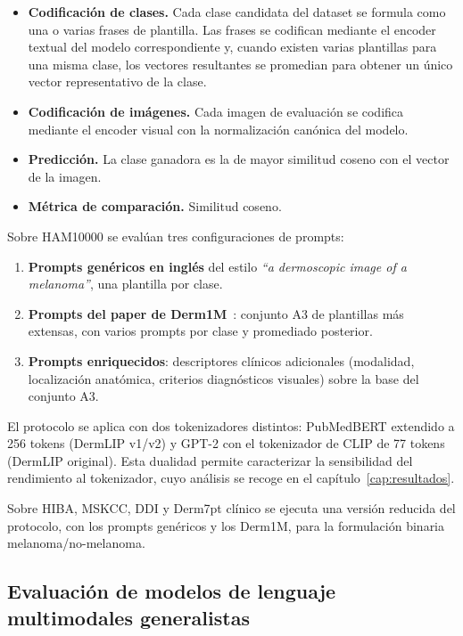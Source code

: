 \begin{itemize}
\item \textbf{Codificación de clases.} Cada clase candidata del
dataset se formula como una o varias frases de plantilla. Las
frases se codifican mediante el encoder textual del modelo
correspondiente y, cuando existen varias plantillas para una
misma clase, los vectores resultantes se promedian para obtener un
único vector representativo de la clase.
\item \textbf{Codificación de imágenes.} Cada imagen de
evaluación se codifica mediante el encoder visual con la
normalización canónica del modelo.
\item \textbf{Predicción.} La clase ganadora es la de mayor
similitud coseno con el vector de la imagen.
\item \textbf{Métrica de comparación.} Similitud coseno.
\end{itemize}

Sobre HAM10000 se evalúan tres configuraciones de prompts:

\begin{enumerate}
\item \textbf{Prompts genéricos en inglés} del estilo \emph{``a
dermoscopic image of a melanoma''}, una plantilla por clase.
\item \textbf{Prompts del paper de Derm1M}~\cite{derm1m}: conjunto
A3 de plantillas más extensas, con varios prompts por clase y
promediado posterior.
\item \textbf{Prompts enriquecidos}: descriptores clínicos
adicionales (modalidad, localización anatómica, criterios
diagnósticos visuales) sobre la base del conjunto A3.
\end{enumerate}

El protocolo se aplica con dos tokenizadores distintos:
PubMedBERT extendido a 256 tokens (DermLIP v1/v2) y GPT-2 con el
tokenizador de CLIP de 77 tokens (DermLIP original). Esta dualidad
permite caracterizar la sensibilidad del rendimiento al
tokenizador, cuyo análisis se recoge en el
capítulo~\ref{cap:resultados}.

Sobre HIBA, MSKCC, DDI y Derm7pt clínico se ejecuta una versión
reducida del protocolo, con los prompts genéricos y los Derm1M,
para la formulación binaria melanoma/no-melanoma.

\subsection{Evaluación de modelos de lenguaje multimodales generalistas}
\label{sec:llm-protocol}

